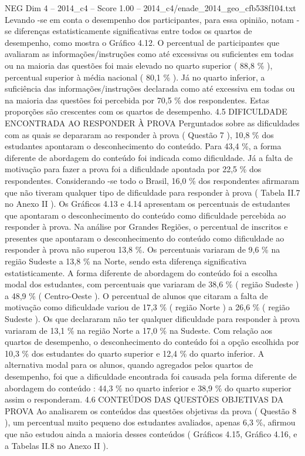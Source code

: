 \begin{textsample}{NEG Dim 4 – 2014\_c4 – Score 1.00 – 2014\_c4/enade\_2014\_geo\_cfb538f104.txt}
Levando -se em conta o desempenho dos participantes, para essa opinião, notam -se diferenças estatisticamente significativas entre todos os quartos de desempenho, como mostra o Gráfico 4.12.
O percentual de participantes que avaliaram as informações/instruções como até excessivas ou suficientes em todas ou na maioria das questões foi mais elevado no quarto superior ( 88,8 \% ), percentual superior à média nacional ( 80,1 \% ).
Já no quarto inferior, a suficiência das informações/instruções declarada como até excessiva em todas ou na maioria das questões foi percebida por 70,5 \% dos respondentes.
Estas proporções são crescentes com os quartos de desempenho. 4.5 DIFICULDADE ENCONTRADA AO RESPONDER À PROVA Perguntados sobre as dificuldades com as quais se depararam ao responder à prova ( Questão 7 ), 10,8 \% dos estudantes apontaram o desconhecimento do conteúdo.
Para 43,4 \%, a forma diferente de abordagem do conteúdo foi indicada como dificuldade.
Já a falta de motivação para fazer a prova foi a dificuldade apontada por 22,5 \% dos respondentes.
Considerando -se todo o Brasil, 16,0 \% dos respondentes afirmaram que não tiveram qualquer tipo de dificuldade para responder à prova ( Tabela II.7 no Anexo II ).
Os Gráficos 4.13 e 4.14 apresentam os percentuais de estudantes que apontaram o desconhecimento do conteúdo como dificuldade percebida ao responder à prova.
Na análise por Grandes Regiões, o percentual de inscritos e presentes que apontaram o desconhecimento do conteúdo como dificuldade ao responder à prova não superou 13,8 \%.
Os percentuais variaram de 9,6 \% na região Sudeste a 13,8 \% na Norte, sendo esta diferença significativa estatisticamente.
A forma diferente de abordagem do conteúdo foi a escolha modal dos estudantes, com percentuais que variaram de 38,6 \% ( região Sudeste ) a 48,9 \% ( Centro-Oeste ).
O percentual de alunos que citaram a falta de motivação como dificuldade variou de 17,3 \% ( região Norte ) a 26,6 \% ( região Sudeste ).
Os que declararam não ter qualquer dificuldade para responder à prova variaram de 13,1 \% na região Norte a 17,0 \% na Sudeste.
Com relação aos quartos de desempenho, o desconhecimento do conteúdo foi a opção escolhida por 10,3 \% dos estudantes do quarto superior e 12,4 \% do quarto inferior.
A alternativa modal para os alunos, quando agregados pelos quartos de desempenho, foi que a dificuldade encontrada foi causada pela forma diferente de abordagem do conteúdo : 44,3 \% no quarto inferior e 38,9 \% do quarto superior assim o responderam. 4.6 CONTEÚDOS DAS QUESTÕES OBJETIVAS DA PROVA Ao analisarem os conteúdos das questões objetivas da prova ( Questão 8 ), um percentual muito pequeno dos estudantes avaliados, apenas 6,3 \%, afirmou que não estudou ainda a maioria desses conteúdos ( Gráficos 4.15, Gráfico 4.16, e a Tabelas II.8 no Anexo II ).

\end{textsample}
